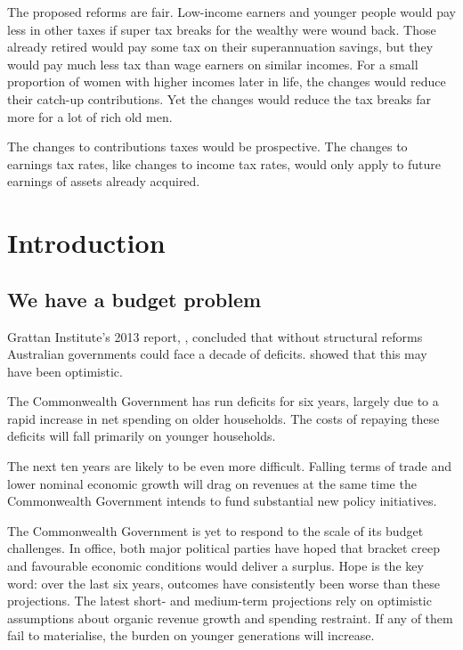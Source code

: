 \begin{overview}[-25pt]
The proposed reforms are fair. Low-income earners and younger people would pay less in other taxes if super tax breaks for the wealthy were wound back. Those already retired would pay some tax on their superannuation savings, but they would pay much less tax than wage earners on similar incomes. For a small proportion of women with higher incomes later in life, the changes would reduce their catch-up contributions. Yet the changes would reduce the tax breaks far more for a lot of rich old men. 

The changes to contributions taxes would be prospective. The changes to earnings tax rates, like changes to income tax rates, would only apply to future earnings of assets already acquired.

\end{overview}
\addtolength{\columnsep}{-\overviewextra}

\chapter{Introduction}
\section{We have a budget problem}
Grattan Institute’s 2013 report, , concluded that without structural reforms Australian governments could face a decade of deficits.   showed that this may have been optimistic. 

The Commonwealth Government has run deficits for six years, largely due to a rapid increase in net spending on older households. The costs of repaying these deficits will fall primarily on younger households.%

The next ten years are likely to be even more difficult. Falling terms of trade and lower nominal economic growth will drag on revenues at the same time the Commonwealth Government intends to fund substantial new policy initiatives.

The Commonwealth Government is yet to respond to the scale of its budget challenges. In office, both major political parties have hoped that bracket creep and favourable economic conditions would deliver a surplus. Hope is the key word: over the last six years, outcomes have consistently been worse than these projections. The latest short- and medium-term projections rely on optimistic assumptions about organic revenue growth and spending restraint. If any of them fail to materialise, the burden on younger generations will increase.

